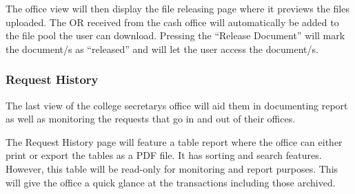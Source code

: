 The office view will then display the file releasing page where it previews the files uploaded. The OR received from the cash office will automatically be added to the file pool the user can download. Pressing the “Release Document” will mark the document/s as “released” and will let the user access the document/s.

\subsubsection{Request History}

The last view of the college secretary\textsc{}s office will aid them in documenting report as well as monitoring the requests that go in and out of their offices.

The Request History page will feature a table report where the office can either print or export the tables as a PDF file. It has sorting and search features. However, this table will be read-only for monitoring and report purposes. This will give the office a quick glance at the transactions including those archived.




